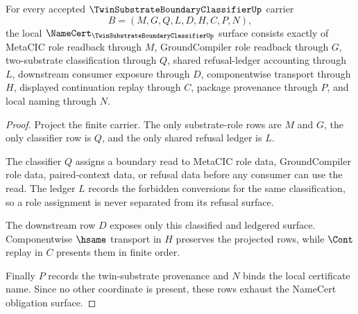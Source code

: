 \begin{theorem}
\label{thm:twin-substrate-boundary-classifier-namecert-obligations}
For every accepted $\TwinSubstrateBoundaryClassifierUp$ carrier
$$
B=(M,G,Q,L,D,H,C,P,N),
$$
the local $\NameCert_{\TwinSubstrateBoundaryClassifierUp}$ surface consists exactly of MetaCIC role readback through $M$, GroundCompiler role readback through $G$, two-substrate classification through $Q$, shared refusal-ledger accounting through $L$, downstream consumer exposure through $D$, componentwise transport through $H$, displayed continuation replay through $C$, package provenance through $P$, and local naming through $N$.
\end{theorem}
\begin{proof}
Project the finite carrier. The only substrate-role rows are $M$ and $G$, the only classifier row is $Q$, and the only shared refusal ledger is $L$.

The classifier $Q$ assigns a boundary read to MetaCIC role data, GroundCompiler role data, paired-context data, or refusal data before any consumer can use the read. The ledger $L$ records the forbidden conversions for the same classification, so a role assignment is never separated from its refusal surface.

The downstream row $D$ exposes only this classified and ledgered surface. Componentwise $\hsame$ transport in $H$ preserves the projected rows, while $\Cont$ replay in $C$ presents them in finite order.

Finally $P$ records the twin-substrate provenance and $N$ binds the local certificate name. Since no other coordinate is present, these rows exhaust the NameCert obligation surface.
\end{proof}


